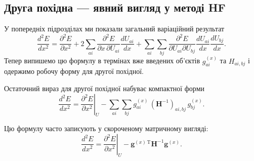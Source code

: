 \subsection{Друга похідна — явний вигляд у методі HF}

У попередніх підрозділах ми показали загальний варіаційний результат
\[
	\frac{d^2E}{dx^2}
	=
	\frac{\partial^2 E}{\partial x^2}
	+2\sum_{ai}\frac{\partial^2 E}{\partial x\,\partial U_{ai}}\frac{dU_{ai}}{dx}
	+\sum_{ai}\sum_{bj}\frac{\partial^2 E}{\partial U_{ai}\partial U_{bj}}
	\frac{dU_{ai}}{dx}\frac{dU_{bj}}{dx}.
\]
Тепер випишемо цю формулу в термінах вже введених об'єктів
$g^{(x)}_{ai}$ та $H_{ai,bj}$ і одержимо робочу форму для другої похідної.


Остаточний вираз для другої похідної набуває компактної форми
\begin{equation}\label{eq:d2E_final_boxed}
	\displaystyle
	\frac{d^2E}{dx^2}
	=
	\left.\frac{\partial^2 E}{\partial x^2}\right|_{U}
	-
	\sum_{ai}\sum_{bj}
	g^{(x)}_{ai}\,(\mathbf{H}^{-1})_{ai,bj}\,g^{(x)}_{bj}.
\end{equation}

Цю формулу часто записують у скороченому матричному вигляді:
\[
	\frac{d^2E}{dx^2} = \left.\frac{\partial^2 E}{\partial x^2}\right|_{U} - \mathbf g^{(x)\,\mathrm T} \mathbf{H}^{-1}\mathbf g^{(x)}.
\]


